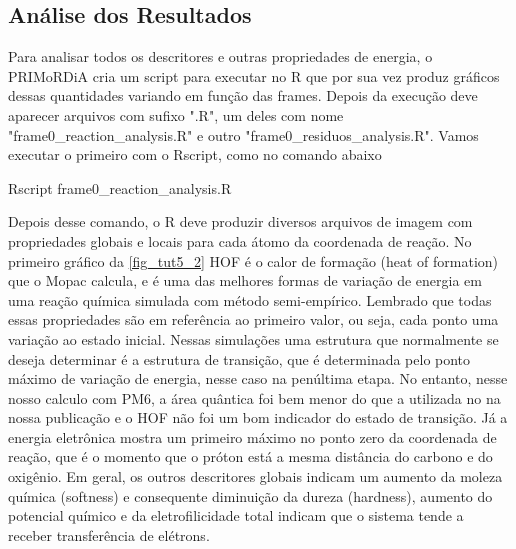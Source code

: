 \documentclass[a4paper,11pt]{refart}
\begin{document}
	 \subsection{Análise dos Resultados}
	 
	 Para analisar todos os descritores e outras propriedades de energia, o PRIMoRDiA cria um script para executar no R que por sua vez produz gráficos dessas quantidades variando em função das frames. Depois da execução deve aparecer arquivos com sufixo ".R", um deles com nome "frame0\_reaction\_analysis.R" e outro "frame0\_residuos\_analysis.R". Vamos executar o primeiro com o Rscript, como no comando abaixo
	 
	 \hspace*{-\leftmarginwidth}
	 \begin{minipage}{\fullwidth}
	 	\begin{commandshell}Rscript frame0_reaction_analysis.R\end{commandshell}
	 \end{minipage}
	 
	 Depois desse comando, o R deve produzir diversos arquivos de imagem com propriedades globais e locais para cada átomo da coordenada de reação. No primeiro gráfico da \autoref{fig_tut5_2} HOF é o calor de formação (heat of formation) que o Mopac calcula, e é uma das melhores formas de variação de energia em uma reação química simulada com método semi-empírico. Lembrado que todas essas propriedades são em referência ao primeiro valor, ou seja, cada ponto uma variação ao estado inicial. Nessas simulações uma estrutura que normalmente se deseja determinar é a estrutura de transição, que é determinada pelo ponto máximo de variação de energia, nesse caso na penúltima etapa. No entanto, nesse nosso calculo com PM6, a área quântica foi bem menor do que a utilizada no na nossa publicação e o HOF não foi um bom indicador do estado de transição. Já a energia eletrônica mostra um primeiro máximo no ponto zero da coordenada de reação, que é o momento que o próton está a mesma distância do carbono e do oxigênio. Em geral, os outros descritores globais indicam um aumento da moleza química (softness) e consequente diminuição da dureza (hardness), aumento do potencial químico e da eletrofilicidade total indicam que o sistema tende a receber transferência de elétrons.
	 
\end{document}
